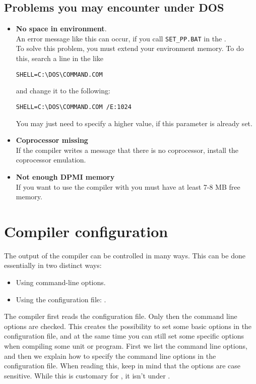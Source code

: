 \documentclass{report}
\begin{document}
\section{Problems you may encounter under DOS}
\begin{itemize}
\item \textbf{No space in environment}.\\
An error message like this can occur, if you call 
\verb|SET_PP.BAT| in the .\\
To solve this problem, you must extend your environment memory.
To do this, search a line in the  like
\begin{verbatim}
SHELL=C:\DOS\COMMAND.COM
\end{verbatim}
and change it to the following: 
\begin{verbatim}
SHELL=C:\DOS\COMMAND.COM /E:1024
\end{verbatim}
You may just need to specify a higher value, if this parameter is already set.
\item \textbf{ Coprocessor missing}\\ 
If the compiler writes
a message that there is no coprocessor, install
the coprocessor emulation.
\item \textbf{Not enough DPMI memory}\\ 
If you want to use the compiler with  you must have at least
7-8 MB free  memory.
\end{itemize}



\chapter{Compiler configuration}
\label{ch:CompilerConfiguration}

The output of the compiler can be controlled in many ways. This can be done
essentially in two distinct ways:
\begin{itemize}
\item Using command-line options.
\item Using the configuration file: .
\end{itemize}
The compiler first reads the configuration file. Only then the command line
options are checked. This creates the possibility to set some basic options
in the configuration file, and at the same time you can still set some
specific options when compiling some unit or program. First we list the
command line options, and then we explain how to specify the command
line options in the configuration file. When reading this, keep in mind
that the options are case sensitive. While this is customary for \linux, it
isn't under \dos.
  
\end{document}
